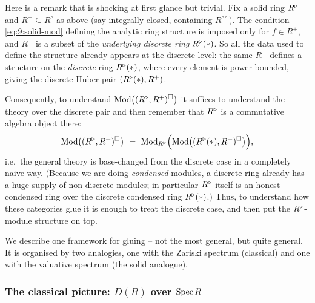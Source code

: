 \begin{remark}
\label{rmk:9:discrete-data}
Here is a remark that is shocking at first glance but trivial. Fix a solid ring
$R^{\triangleright}$ and $R^{+}\subseteq R^{\circ}$ as above (say integrally closed,
containing $R^{\circ\circ}$). The condition \eqref{eq:9:solid-mod} defining the
analytic ring structure is imposed only for $f\in R^{+}$, and $R^{+}$ is a
subset of the \emph{underlying discrete ring} $R^{\triangleright}(\ast)$. So all the data
used to define the structure already appears at the discrete level: the same
$R^{+}$ defines a structure on the \emph{discrete} ring $R^{\triangleright}(\ast)$, where
every element is power-bounded, giving the discrete Huber pair
$(R^{\triangleright}(\ast),R^{+})$.

Consequently, to understand $\operatorname{Mod}\bigl((R^{\triangleright},R^{+})^{\square}\bigr)$ it suffices
to understand the theory over the discrete pair and then remember that $R^{\triangleright}$
is a commutative algebra object there:
\begin{equation*}
\operatorname{Mod}\bigl((R^{\triangleright},R^{+})^{\square}\bigr)\ =\ \operatorname{Mod}_{R^{\triangleright}}\Bigl(\operatorname{Mod}\bigl(
(R^{\triangleright}(\ast),R^{+})^{\square}\bigr)\Bigr),
\end{equation*}
i.e.\ the general theory is base-changed from the discrete case in a completely
naive way. (Because we are doing \emph{condensed} modules, a discrete ring
already has a huge supply of non-discrete modules; in particular $R^{\triangleright}$ itself
is an honest condensed ring over the discrete condensed ring $R^{\triangleright}(\ast)$.)
Thus, to understand how these categories glue it is enough to treat the discrete
case, and then put the $R^{\triangleright}$-module structure on top.
\end{remark}

We describe one framework for gluing -- not the most general, but quite
general. It is organised by two analogies, one with the Zariski spectrum
(classical) and one with the valuative spectrum (the solid analogue).

\subsubsection*{The classical picture: $D(R)$ over $\operatorname{Spec} R$}

